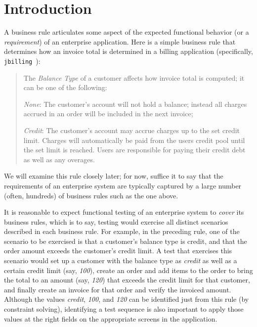\section{Introduction}

A business rule articulates some aspect of the expected functional behavior (or
a \textit{requirement}) of an enterprise application. Here is a simple business
rule that determines how an invoice total is determined in a billing
application (specifically, \texttt{jbilling}~\cite{jbilling}):
%
\begin{quote}
{\small
	
The \textit{Balance Type} of a customer affects how invoice total is computed;
it can be one of the following:

\textit{None}: The customer's account will not hold a balance; instead all
charges accrued in an order will be included in the next invoice;
	
\textit{Credit}: The customer's account may accrue charges up to the set credit
limit.  Charges will automatically be paid from the users credit pool until the
set limit is reached.  Users are responsible for paying their credit debt as
well as any overages.

}
\end{quote}	
%
We will examine this rule closely later; for now, suffice it to say that the
requirements of an enterprise system are typically captured by a large number
(often, hundreds) of business rules such as the one above.

It is reasonable to expect functional testing of an enterprise system to
\textit{cover} its business rules, which is to say, testing would exercise all
distinct scenarios described in each business rule.  For example, in the
preceding rule, one of the scenario to be exercised is that a customer's balance
type is credit, and that the order amount exceeds the customer's credit limit.
A test that exercises this scenario would set up a customer with the balance
type as \textit{credit} as well as a certain credit limit (say, \textit{100}),
create an order and add items to the order to bring the total to an amount (say,
\textit{120}) that exceeds the credit limit for that customer, and finally
create an invoice for that order and verify the invoiced amount.
Although the values
\textit{credit}, \textit{100}, and \textit{120} can be identified just from this
rule (by constraint solving), identifying a test sequence is also important to
apply those values at the right fields on the appropriate
screens in the application.

